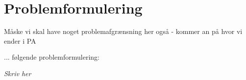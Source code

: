 \chapter{Problemformulering}
\label{cha:problemformulering}

Måske vi skal have noget problemafgrænsning her også - kommer an på hvor vi ender i PA


... følgende problemformulering:
\begin{center}
\textit{Skriv her}
\end{center}